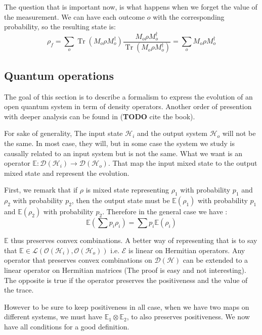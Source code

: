 \documentclass[10pt]{report}
\theoremstyle{plain}
\theoremstyle{definition}
\theoremstyle{remark}
\newcommand{\TODO}{\textbf{TODO}}
\DeclareMathOperator{\Tr}{Tr}
\newcommand{\trnorm}[1]{\frac{#1}{\Tr\left({#1}\right)}}
\begin{document}
The question that is important now, is what happens when we forget the value of
the measurement. We can have each outcome $o$ with the corresponding
probability, so the resulting state is:
\[\rho_f = \sum_o \Tr(M_o\rho M_o^\dagger)\trnorm{M_o\rho M_o^\dagger}
  =\sum_o M_o\rho M_o^\dagger \]



\subsection{Quantum operations}

The goal of this section is to describe a formalism to express the evolution of
an open quantum system in term of density operators. Another order of presention
with deeper analysis can be found in (\TODO{} cite the book).

For sake of generality, The input state
$\mathcal{H}_i$ and the output system $\mathcal{H}_o$ will not be the same. In
most case, they will, but in some case the system we study is causally related to
an input system but is not the same.
What we want is an operator $\mathbb{E} : \mathcal{D}(\mathcal{H}_i) \to
\mathcal{D}(\mathcal{H}_o)$. That map the input mixed state to the output mixed
state and represent the evolution.

First, we remark that if $\rho$ is mixed state representing $\rho_1$ with
probability $p_1$ and $\rho_2$ with probability $p_2$, then the output state
must be $\mathbb E(\rho_1)$ with probability $p_1$ and $\mathbb E(\rho_2)$ with
probability $p_2$. Therefore in the general case we have :
\[\mathbb E(\sum p_i \rho_i) = \sum p_i \mathbb E(\rho_i)\]

$\mathbb E$ thus preserves convex combinations. A better way of representing
that is to say that $\mathbb E \in
\mathcal{L}(\mathcal{O}(\mathcal{H}_i),\mathcal{O}(\mathcal{H}_o))$ i.e.
$\mathcal{E}$ is linear on Hermitian operators. Any operator that preserves
convex combinations on $\mathcal{D}(\mathcal{H})$ can be extended to a linear
operator on Hermitian matrices (The proof is easy and not interesting). The
opposite is true if the operator preserves the positiveness and the value of the
trace.

However to be sure to keep positiveness in all case, when we have two maps on
different systems, we must have $\mathbb{E}_1
\otimes \mathbb{E}_2$, to also preserves positiveness. We now have all
conditions for a good definition.
\end{document}
